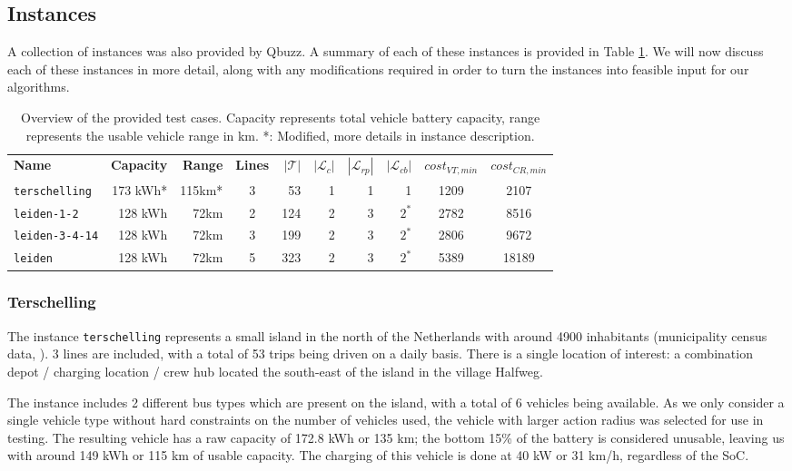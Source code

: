 \documentclass[]{article}
\begin{document}
\subsection{Instances}
A collection of instances was also provided by Qbuzz. A summary of each of these instances is provided in Table \ref{tab:instances}. We will now discuss each of these instances in more detail, along with any modifications required in order to turn the instances into feasible input for our algorithms. 

\begin{table}[h]
  \centering
  \begin{tabular}{lrrcrrrrcc}
    \toprule
       \textbf{Name} & \textbf{Capacity} & \textbf{Range} & \textbf{Lines} & $|\mathcal{T}|$ & $|\mathcal{L}_c|$ & $|\mathcal{L}_{rp}|$ & $|\mathcal{L}_{cb}|$ & $cost_{VT,min}$ & $cost_{CR,min}$ \\
        \cmidrule(lr){1-1}\cmidrule(lr){2-3}\cmidrule(lr){4-8} \cmidrule(lr){9-10}
        \texttt{terschelling}  & 173 kWh* & 115km* & 3 & 53 & 1 & 1 & 1  & 1209 & 2107 \\
        \texttt{leiden-1-2}  & 128 kWh & 72km & 2 & 124 & 2 & 3 & $2^*$  & 2782 & 8516 \\
        \texttt{leiden-3-4-14} & 128 kWh & 72km & 3 & 199 & 2 & 3 & $2^*$  & 2806 & 9672 \\
        \texttt{leiden}  & 128 kWh & 72km & 5 & 323 & 2 & 3 & $2^*$ & 5389 & 18189 \\
        \bottomrule
  \end{tabular}
  \caption{Overview of the provided test cases. Capacity represents total vehicle battery capacity, range represents the usable vehicle range in km. *: Modified, more details in instance description.}
  \label{tab:instances}
\end{table}

\subsubsection{Terschelling}
The instance \texttt{terschelling} represents a small island in the north of the Netherlands with around 4900 inhabitants (municipality census data, \citet{Terschelling2025}). 3 lines are included, with a total of 53 trips being driven on a daily basis. There is a single location of interest: a combination depot / charging location / crew hub located the south-east of the island in the village Halfweg. 

The instance includes 2 different bus types which are present on the island, with a total of 6 vehicles being available. As we only consider a single vehicle type without hard constraints on the number of vehicles used, the vehicle with larger action radius was selected for use in testing. The resulting vehicle has a raw capacity of 172.8 kWh or 135 km; the bottom 15\% of the battery is considered unusable, leaving us with around 149 kWh or 115 km of usable capacity. The charging of this vehicle is done at 40 kW or 31 km/h, regardless of the SoC.
\end{document}

